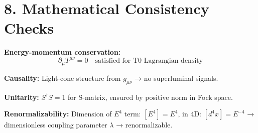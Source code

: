 	\section*{8. Mathematical Consistency Checks}
	
	\textbf{Energy-momentum conservation:}
	\[
	\partial_\mu T^{\mu\nu} = 0 \quad \text{satisfied for T0 Lagrangian density}
	\]
	
	\textbf{Causality:} Light-cone structure from $g_{\mu\nu}$ → no superluminal signals.
	
	\textbf{Unitarity:} $S^\dagger S = 1$ for S-matrix, ensured by positive norm in Fock space.
	
	\textbf{Renormalizability:} Dimension of $E^4$ term: $[E^4] = E^4$, in 4D: $[d^4x] = E^{-4}$ → dimensionless coupling parameter $\lambda$ → renormalizable.
	